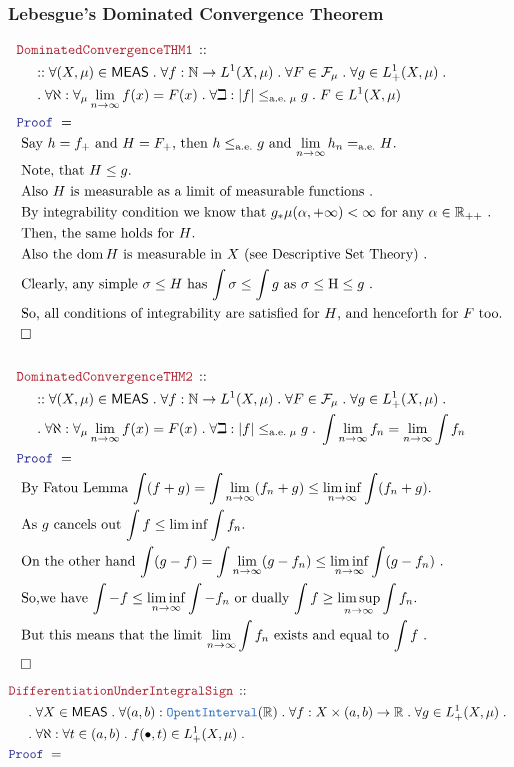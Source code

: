 \documentclass[12pt]{scrartcl}
\newcommand{\TYPE}[1]{\textcolor{NavyBlue}{\mathtt{#1}}}
\newcommand{\LOGIC}[1]{\textcolor{Blue}{\mathtt{#1}}}
\newcommand{\THM}[1]{\textcolor{Maroon}{\mathtt{#1}}}
\renewcommand{\.}{\; . \;}
\newcommand{\Theorem}[2]{& \THM{#1} \, :: \, #2 \\ & \Proof = \\ }
\newcommand{\NewLine}{\\ & \kern 1pc}
\newcommand{\Page}[1]{ \begin{align*} #1 \end{align*}   }
\newcommand{\Reals}{\mathbb{R} }
\newcommand{\Nat}{\mathbb{N} }
\newcommand{\QED}{\; \square}
\newcommand{\EndProof}{& \QED \\}
\newcommand{\Proof}{\LOGIC{Proof} \; }
\newcommand{\Explain}[1]{& \text{#1.} \\}
\DeclareMathOperator*{\dom}{dom}
\renewcommand{\H}{\mathrm{H}}
\renewcommand{\ae}{\mathrm{a.e.}}
\newcommand{\F}{\mathcal{F}}
\newcommand{\MEAS}{\mathsf{MEAS}}
\begin{document}
\subsubsection{Lebesgue's Dominated Convergence Theorem}
\Page{
	\Theorem{DominatedConvergenceTHM1}
	{
		\NewLine ::		 
		\forall (X,\mu) \in \MEAS \.
		\forall f : \Nat \to L^1(X,\mu) \.
		\forall F \in \F_\mu \.
		\forall g \in L^1_+(X,\mu) \. \NewLine \. 
		\forall \aleph : \forall_\mu \lim_{n \to \infty} f(x) = F(x) \.
		\forall \beth  : |f| \le_{\ae \; \mu} g \.   
		F \in L^1(X,\mu)
	}
	\Explain{ 
		Say $h= f_+$ and $H = F_+$, then $h \le_{\ae} g$ and $\lim_{n \to \infty} h_n =_{\ae} H$}
	\Explain{
		Note, that $H \le g$}
	\Explain{
		Also $H$ is measurable as a limit of measurable functions
	}
	\Explain{
		By integrability condition we know that 
		$ g_*\mu(\alpha,+\infty) < \infty$		
		for any $\alpha \in \Reals_{++}$
	}
	\Explain{
		Then, the same holds  for $H$}
	\Explain{
		Also the $\dom H$ is measurable in $X$ (see Descriptive Set Theory)
	}
	\Explain{
		Clearly, any simple $\sigma\le H$ has $\int \sigma \le \int g$ as $\sigma \le \H \le g$
	}
	\Explain{
		So, all conditions of integrability are satisfied for $H$, and henceforth for $F$ too}
	\EndProof
	\\
	\Theorem{DominatedConvergenceTHM2}
	{
		\NewLine ::		 
		\forall (X,\mu) \in \MEAS \.
		\forall f : \Nat \to L^1(X,\mu) \.
		\forall F \in \F_\mu \.
		\forall g \in L^1_+(X,\mu) \. \NewLine \. 
		\forall \aleph : \forall_\mu \lim_{n \to \infty} f(x) = F(x) \.
		\forall \beth  : |f| \le_{\ae \; \mu} g \.   
		\int \lim_{n \to \infty} f_n = \lim_{n \to \infty} \int f_n 
	}
	\Explain{ 
		By Fatou Lemma
		$
			\int (f + g) =
			\int \lim_{n \to \infty}	(f_n + g) \le 
			\liminf_{n \to \infty} \int (f_n + g)
	$}
	\Explain{
		As $g$ cancels out
		$
			\int f \le \liminf \int f_n
		$}
	\Explain{
		On the other hand 
		$
			\int (g - f) = 
			\int \lim_{n \to \infty}	(g - f_n) \le 
			\liminf_{n \to \infty} \int (g - f_n)
		$ }
	\Explain{
		So,we have 
		$
 			 \int  -f \le   \liminf_{n \to \infty} \int - f_n
		$ or dually
		$
			\int f \ge \limsup_{n \to \infty} \int f_n
		$}
	\Explain{
		But this means that the limit $\lim_{n \to \infty} \int f_n$ exists and equal to $\int f$
	}
	\EndProof
}\Page{
	\Theorem{DifferentiationUnderIntegralSign}
	{
		\NewLine \.		
		\forall X \in \MEAS \.
		\forall (a,b) : \TYPE{OpentInterval}(\Reals) \.
		\forall f : X\times(a,b) \to \Reals \.
		\forall g \in L^1_+(X,\mu) \. \NewLine \.
		\forall \aleph :		
		\forall t \in (a,b) \.
		f(\bullet,t ) \in L^1_+(X,\mu) \. 
}}
\end{document}

